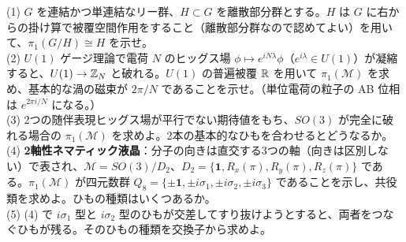 \begin{problem}[難易度 D]\label{ch02-prob-strings}
(1) $G$ を連結かつ単連結なリー群、$H\subset G$ を離散部分群とする。$H$ は $G$ に右からの掛け算で被覆空間作用をすること（離散部分群なので認めてよい）を用いて、$\pi_1(G/H)\cong H$ を示せ。\\
(2) $U(1)$ ゲージ理論で電荷 $N$ のヒッグス場 $\phi\mapsto e^{iN\lambda}\phi$（$e^{i\lambda}\in U(1)$）が凝縮すると、$U(1)\to\mathbb{Z}_N$ と破れる。$U(1)$ の普遍被覆 $\mathbb{R}$ を用いて $\pi_1(\mathcal M)$ を求め、基本的な渦の磁束が $2\pi/N$ であることを示せ。（単位電荷の粒子の AB 位相は $e^{2\pi i/N}$ になる。）\\
(3) 2つの随伴表現ヒッグス場が平行でない期待値をもち、$SO(3)$ が完全に破れる場合の $\pi_1(\mathcal M)$ を求めよ。2本の基本的なひもを合わせるとどうなるか。\\
(4) \textbf{2軸性ネマティック液晶}：分子の向きは直交する3つの軸（向きは区別しない）で表され、$\mathcal M=SO(3)/D_2$、$D_2=\{\mathbf 1,R_x(\pi),R_y(\pi),R_z(\pi)\}$ である。$\pi_1(\mathcal M)$ が四元数群 $Q_8=\{\pm\mathbf 1,\pm i\sigma_1,\pm i\sigma_2,\pm i\sigma_3\}$ であることを示し、共役類を求めよ。ひもの種類はいくつあるか。\\
(5) (4) で $i\sigma_1$ 型と $i\sigma_2$ 型のひもが交差してすり抜けようとすると、両者をつなぐひもが残る。そのひもの種類を交換子から求めよ。
\end{problem}

